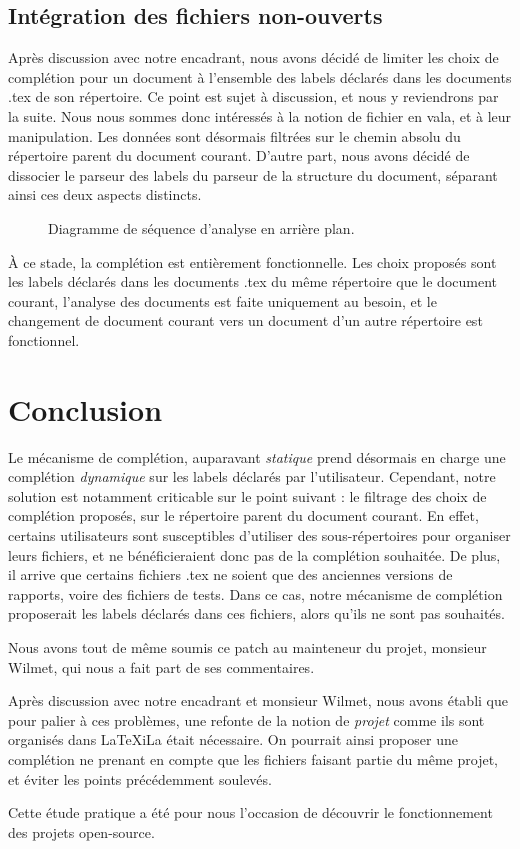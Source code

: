 \documentclass[a4paper,11pt]{report}
\begin{document}
\section{Intégration des fichiers non-ouverts}
Après discussion avec notre encadrant, nous avons décidé de limiter les choix de complétion pour un document à l'ensemble des labels déclarés dans les documents .tex de son répertoire.
Ce point est sujet à discussion, et nous y reviendrons par la suite.
Nous nous sommes donc intéressés à la notion de fichier en vala, et à leur manipulation.
Les données sont désormais filtrées sur le chemin absolu du répertoire parent du document courant.
D'autre part, nous avons décidé de dissocier le parseur des labels du parseur de la structure du document, séparant ainsi ces deux aspects distincts.

\begin{figure}[h]
\label{fig:multiple_doc_completion}
\centering

\caption{Diagramme de séquence d'analyse en arrière plan.}
\end{figure}

À ce stade, la complétion est entièrement fonctionnelle.
Les choix proposés sont les labels déclarés dans les documents .tex du même répertoire que le document courant, l'analyse des documents est faite uniquement au besoin, et le changement de document courant vers un document d'un autre répertoire est fonctionnel.

\chapter*{Conclusion}
Le mécanisme de complétion, auparavant \textit{statique} prend désormais en charge une complétion \textit{dynamique} sur les labels déclarés par l'utilisateur.
Cependant, notre solution est notamment criticable sur le point suivant : le filtrage des choix de complétion proposés, sur le répertoire parent du document courant.
En effet, certains utilisateurs sont susceptibles d'utiliser des sous-répertoires pour organiser leurs fichiers, et ne bénéficieraient donc pas de la complétion souhaitée.
De plus, il arrive que certains fichiers .tex ne soient que des anciennes versions de rapports, voire des fichiers de tests. Dans ce cas, notre mécanisme de complétion proposerait les labels déclarés dans ces fichiers, alors qu'ils ne sont pas souhaités.

Nous avons tout de même soumis ce patch au mainteneur du projet, monsieur Wilmet, qui nous a fait part de ses commentaires.

Après discussion avec notre encadrant et monsieur Wilmet, nous avons établi que pour palier à ces problèmes, une refonte de la notion de \textit{projet} comme ils sont organisés dans LaTeXiLa était nécessaire.
On pourrait ainsi proposer une complétion ne prenant en compte que les fichiers faisant partie du même projet, et éviter les points précédemment soulevés.

Cette étude pratique a été pour nous l'occasion de découvrir le fonctionnement des projets open-source.
\end{document}
